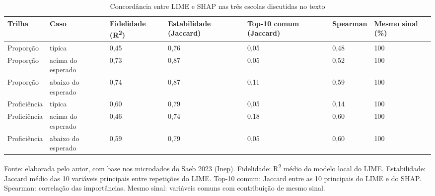 \begin{table}[H]
    \centering
    \footnotesize
    \caption{Concordância entre LIME e SHAP nas três escolas discutidas no texto}
    \begin{tabular}{L{1.9cm}L{2.6cm}C{1.5cm}C{1.6cm}C{1.6cm}C{1.5cm}C{1.4cm}}
        \toprule
        \textbf{Trilha} & \textbf{Caso} & \textbf{Fidelidade (R\textsuperscript{2})} & \textbf{Estabilidade (Jaccard)} & \textbf{Top-10 comum (Jaccard)} & \textbf{Spearman} & \textbf{Mesmo sinal (\%)} \\
        \midrule
        Proporção & típica & 0,45 & 0,76 & 0,05 & 0,48 & 100 \\
        Proporção & acima do esperado & 0,73 & 0,87 & 0,05 & 0,52 & 100 \\
        Proporção & abaixo do esperado & 0,74 & 0,87 & 0,11 & 0,59 & 100 \\
        Proficiência & típica & 0,60 & 0,79 & 0,05 & 0,14 & 100 \\
        Proficiência & acima do esperado & 0,46 & 0,74 & 0,18 & 0,60 & 100 \\
        Proficiência & abaixo do esperado & 0,59 & 0,79 & 0,05 & 0,60 & 100 \\
        \bottomrule
    \end{tabular}
    \vspace{0.1cm}
    \begin{flushleft}
    {\footnotesize Fonte: elaborada pelo autor, com base nos microdados do Saeb 2023 (Inep). Fidelidade: R\textsuperscript{2} médio do modelo local do LIME. Estabilidade: Jaccard médio das 10 variáveis principais entre repetições do LIME. Top-10 comum: Jaccard entre as 10 principais do LIME e do SHAP. Spearman: correlação das importâncias. Mesmo sinal: variáveis comuns com contribuição de mesmo sinal.}
    \end{flushleft}
    \label{tab:lime}
\end{table}
